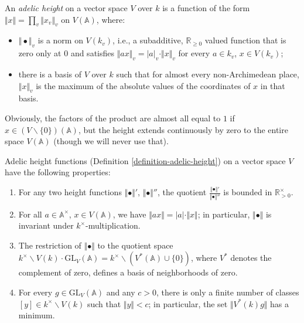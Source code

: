 \begin{definition}
 \label{definition-adelic-height}
An \emph{adelic height} on a vector space $V$ over $k$ is a function of the form $\Vert x\Vert = \prod_v \Vert x_v \Vert_v$ on $V(\mathbb A)$, where:
\begin{itemize}
 \item $\Vert \bullet \Vert_v$ is a norm on $V(k_v)$, i.e., a subadditive, $\mathbb R_{\ge 0}$ valued function that is zero only at $0$ and satisfies $\Vert a x \Vert_v = |a|_v \cdot \Vert x \Vert_v$ for every $a\in k_v$, $x\in V(k_v)$;
 \item there is a basis of $V$ over $k$ such that for almost every non-Archimedean place, $\Vert x\Vert_v$ is the maximum of the absolute values of the coordinates of $x$ in that basis.
\end{itemize}
\end{definition}

Obviously, the factors of the product are almost all equal to $1$ if $x\in (V\smallsetminus\{0\})(\mathbb A)$, but the height extends continuously by zero to the entire space $V(\mathbb A)$ (though we will never use that).


\begin{lemma}
 \label{lemma-height-functions}
Adelic height functions (Definition \ref{definition-adelic-height}) on a vector space $V$ have the following properties:
\begin{enumerate}
 \item For any two height functions $\Vert \bullet \Vert'$, $\Vert\bullet\Vert''$, the quotient $\frac{\Vert\bullet\Vert'}{\Vert\bullet\Vert''}$ is bounded in $\mathbb R_{>0}^\times$.
 \item For all $a\in \mathbb A^\times$, $x\in V(\mathbb A)$, we have $\Vert a x \Vert = |a|\cdot \Vert x \Vert$; in particular, $\Vert \bullet \Vert$ is invariant under $k^\times$-multiplication.
 \item The restriction of $\Vert\bullet\Vert$ to the quotient space $k^\times \backslash V(k)\cdot \text{GL}_V(\mathbb A) = k^\times\backslash (V^*(\mathbb A)\cup \{0\})$, where $V^*$ denotes the complement of zero, defines a basis of neighborhoods of zero.
 \item For every $g\in \text{GL}_V(\mathbb A)$ and any $c>0$, there is only a finite number of classes $[y]\in k^\times \backslash V(k)$ such that $\Vert y\Vert <c$; in particular, the set $\Vert V^*(k)g\Vert$ has a minimum.
\end{enumerate}

\end{lemma}

